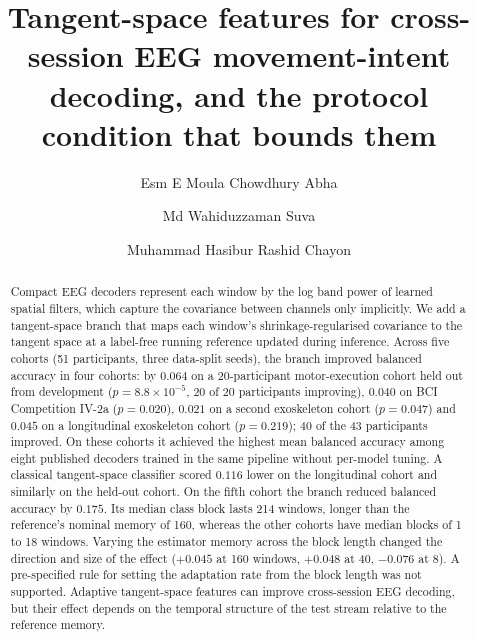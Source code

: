\documentclass[a4paper,fleqn]{cas-dc}
\begin{document}
\let\WriteBookmarks\relax
\def\floatpagepagefraction{1}
\def\textpagefraction{.001}


\title[mode = title]{Tangent-space features for cross-session EEG movement-intent decoding, and the protocol condition that bounds them}

\author[1]{Esm E Moula Chowdhury Abha}

\author[1]{Md Wahiduzzaman Suva}
\cormark[1]

\author[1]{Muhammad Hasibur Rashid Chayon}



\begin{abstract}
Compact EEG decoders represent each window by the log band power of learned
spatial filters, which capture the covariance between channels only implicitly.
We add a tangent-space branch that maps each window's shrinkage-regularised
covariance to the tangent space at a label-free running reference updated during
inference. Across five cohorts (51 participants, three data-split seeds), the
branch improved balanced accuracy in four cohorts: by
$0.064$ on a 20-participant motor-execution cohort held out from development
($p=8.8\times10^{-5}$, 20 of 20 participants improving), $0.040$ on BCI
Competition IV-2a ($p=0.020$), $0.021$ on a second exoskeleton cohort
($p=0.047$) and $0.045$ on a longitudinal exoskeleton cohort ($p=0.219$); 40 of
the 43 participants improved. On these cohorts it achieved the highest mean
balanced accuracy among eight published decoders trained in the same pipeline
without per-model tuning. A classical tangent-space classifier scored $0.116$
lower on the longitudinal cohort and similarly on the held-out cohort. On the
fifth cohort the branch reduced balanced accuracy by $0.175$. Its median class
block lasts 214 windows, longer than the reference's nominal memory of 160,
whereas the other cohorts have median blocks of 1 to 18 windows. Varying the
estimator memory across the block length changed the direction and size of the
effect ($+0.045$ at 160 windows, $+0.048$ at 40, $-0.076$ at 8). A pre-specified
rule for setting the adaptation rate from the block length was not supported.
Adaptive tangent-space features can improve cross-session EEG decoding, but
their effect depends on the temporal structure of the test stream relative to
the reference memory.
\end{abstract}
\end{document}
